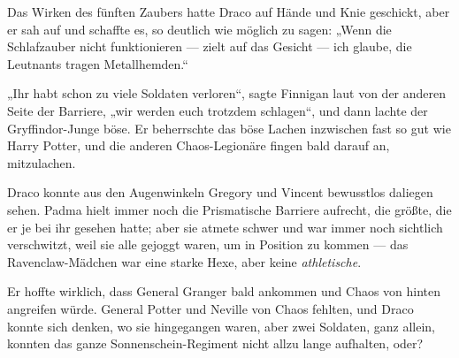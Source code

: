 Das Wirken des fünften Zaubers hatte Draco auf Hände und Knie geschickt, aber er sah auf und schaffte es, so deutlich wie möglich zu sagen:
„Wenn die Schlafzauber nicht funktionieren — zielt auf das Gesicht — ich glaube, die Leutnants tragen Metallhemden.“

„Ihr habt schon zu viele Soldaten verloren“, sagte Finnigan laut von der anderen Seite der Barriere, „wir werden euch trotzdem schlagen“, und dann lachte der Gryffindor-Junge böse. Er beherrschte das böse Lachen inzwischen fast so gut wie Harry Potter, und die anderen Chaos-Legionäre fingen bald darauf an, mitzulachen.

Draco konnte aus den Augenwinkeln Gregory und Vincent bewusstlos daliegen sehen. Padma hielt immer noch die Prismatische Barriere aufrecht, die größte, die er je bei ihr gesehen hatte; aber sie atmete schwer und war immer noch sichtlich verschwitzt, weil sie alle gejoggt waren, um in Position zu kommen — das Ravenclaw-Mädchen war eine starke Hexe, aber keine \emph{athletische}.

Er hoffte wirklich, dass General Granger bald ankommen und Chaos von hinten angreifen würde. General Potter und Neville von Chaos fehlten, und Draco konnte sich denken, wo sie hingegangen waren, aber zwei Soldaten, ganz allein, konnten das ganze Sonnenschein-Regiment nicht allzu lange aufhalten, oder?

\later

